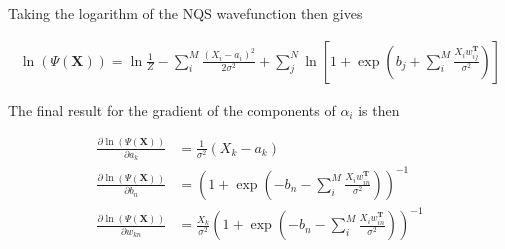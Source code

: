\noindent Taking the logarithm of the NQS wavefunction then gives

\begin{align}
    \ln( \Psi(\mathbf{X}) )  = \ln{\frac{1}{Z}} -\sum_i^M \frac{(X_i - a_i)^2}{2\sigma^2} 
    + \sum_j^N \ln\left[  1 + \exp\left(b_j  + \sum_i^M \frac{X_i w^\mathbf{T}_{ij}}{\sigma^2}\right) \right]
\end{align}

\noindent  The final result for the gradient of the components of $\alpha_i$ is then  

\begin{align}
    \frac{\partial \ln( \Psi(\mathbf{X}) )}{\partial a_k} &= \frac{1}{\sigma ^2} (X_k - a_k)\\
    \frac{\partial \ln( \Psi(\mathbf{X}) )}{\partial b_n} &= \left(1 +  \exp\left(- b_n  - \sum_i^M \frac{X_i w^\mathbf{T}_{in}}{\sigma^2}\right)  \right)^{-1}  \\
    \frac{\partial \ln( \Psi(\mathbf{X}) )}{\partial w_{kn}}& = \frac{X_k}{\sigma^2} \left(1 +  \exp\left(- b_n  - \sum_i^M \frac{X_i w^\mathbf{T}_{in}}{\sigma^2}\right)  \right)^{-1}   
\end{align}
